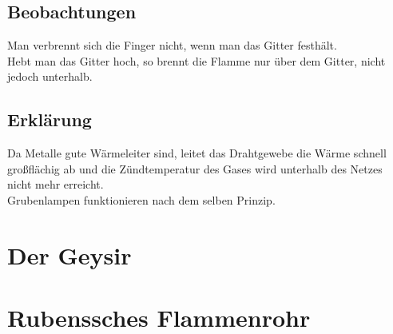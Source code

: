 \subsection{Beobachtungen}

Man verbrennt sich die Finger nicht, wenn man das Gitter festhält.\\
Hebt man das Gitter hoch, so brennt die Flamme nur über dem Gitter, nicht jedoch unterhalb.

\subsection{Erklärung}

Da Metalle gute Wärmeleiter sind, leitet das Drahtgewebe die Wärme schnell großflächig ab und die Zündtemperatur des Gases wird unterhalb des Netzes nicht mehr erreicht.\\
Grubenlampen funktionieren nach dem selben Prinzip.

\section{Der Geysir}

\section{Rubenssches Flammenrohr}
